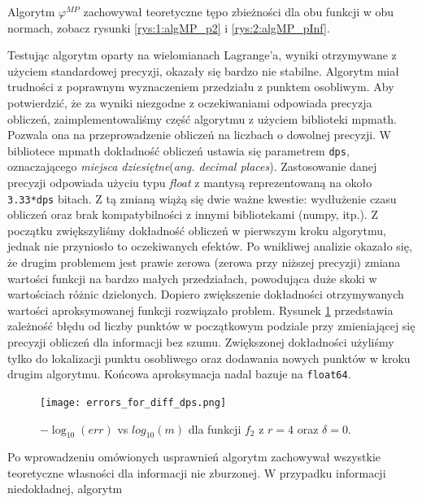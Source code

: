 \documentclass[oik, pdftex, man]{mgrwms}
\begin{document}
    Algorytm $\varphi^{MP}$ zachowywał teoretyczne tępo zbieżności dla obu funkcji w obu normach, zobacz rysunki \ref{rys:1:algMP_p2} i \ref{rys:2:algMP_pInf}.

    Testując algorytm oparty na wielomianach Lagrange'a, wyniki otrzymywane z użyciem standardowej precyzji, okazały się bardzo nie stabilne. Algorytm miał trudności z poprawnym wyznaczeniem przedziału z punktem osobliwym.
    Aby potwierdzić, że za wyniki niezgodne z oczekiwaniami odpowiada precyzja obliczeń, zaimplementowaliśmy część algorytmu z użyciem biblioteki mpmath. Pozwala ona na przeprowadzenie obliczeń na liczbach o dowolnej precyzji. W bibliotece mpmath dokładność obliczeń ustawia się parametrem \verb+dps+, oznaczającego \textit{miejsca dziesiętne}(\textit{ang. decimal places}). Zastosowanie danej precyzji odpowiada użyciu typu \textit{float} z mantysą reprezentowaną na około \verb+3.33*dps+ bitach. Z tą zmianą wiążą się dwie ważne kwestie: wydłużenie czasu obliczeń oraz brak kompatybilności z innymi bibliotekami (numpy, itp.).
    Z początku zwiększyliśmy dokładność obliczeń w pierwszym kroku algorytmu, jednak nie przyniosło to oczekiwanych efektów. Po wnikliwej analizie okazało się, że drugim problemem jest prawie zerowa (zerowa przy niższej precyzji) zmiana wartości funkcji na bardzo małych przedziałach, powodująca duże skoki w wartościach różnic dzielonych. Dopiero zwiększenie dokładności otrzymywanych wartości aproksymowanej funkcji rozwiązało problem. Rysunek \ref{rys:3:diff_dps} przedstawia zależność błędu od liczby punktów w początkowym podziale przy zmieniającej się precyzji obliczeń dla informacji bez szumu. Zwiększonej dokładności użyliśmy tylko do lokalizacji punktu osobliwego oraz dodawania nowych punktów w kroku drugim algorytmu. Końcowa aproksymacja nadal bazuje na \verb+float64+.

    \begin{figure}
        \centering
        \texttt{[image: errors\_for\_diff\_dps.png]}
        \caption{$-\log_{10}(err)$ vs $log_{10}(m)$ dla funkcji $f_{2}$ z $r = 4$ oraz $\delta = 0$.}
        \label{rys:3:diff_dps}
    \end{figure}
    
    Po wprowadzeniu omówionych usprawnień algorytm zachowywał wszystkie teoretyczne własności dla informacji nie zburzonej. W przypadku informacji niedokładnej, algorytm
    
\end{document}
